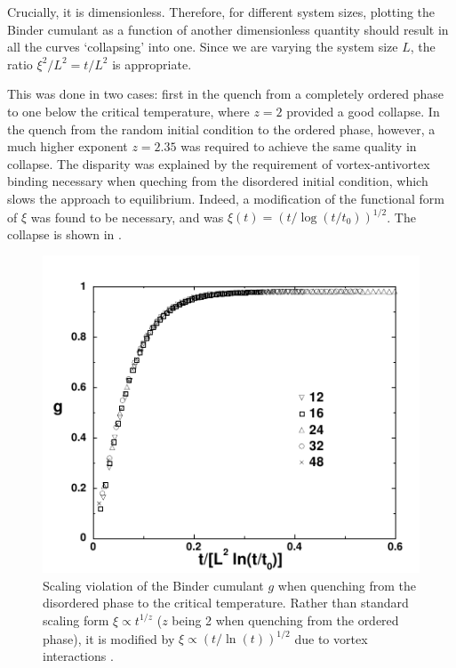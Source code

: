 Crucially, it is dimensionless. Therefore, for different system sizes, plotting the Binder cumulant as a function of another dimensionless quantity should result in all the curves `collapsing' into one. Since we are varying the system size $L$, the ratio $\xi^2/L^2 = t/L^2$ is appropriate. 

This was done in two cases: first in the quench from a completely ordered phase to one below the critical temperature, where $z=2$ provided a good collapse. In the quench from the random initial condition to the ordered phase, however, a much higher exponent $z=2.35$ was required to achieve the same quality in collapse. The disparity was explained by the requirement of vortex-antivortex binding necessary when queching from the disordered initial condition, which slows the approach to equilibrium. Indeed, a modification of the functional form of $\xi$ was found to be necessary, and was $\xi(t) = (t/\log(t/t_0))^{1/2}$. The collapse is shown in \fig{\ref{fig:xyscaling}}.

\begin{figure}[htbp!]
	\centering
	\includegraphics[scale=0.9]{./xyscaling.pdf}
	\caption{Scaling violation of the Binder cumulant $g$ when quenching from the disordered phase to the critical temperature. 
	Rather than standard scaling form $\xi \propto t^{1/z}$ ($z$ being 2 when quenching from the ordered phase), it is modified by $\xi \propto (t/\ln(t))^{1/2}$ due to vortex interactions \cite{PhysRevLett.84.1503}.}
	\label{fig:xyscaling}
\end{figure}

